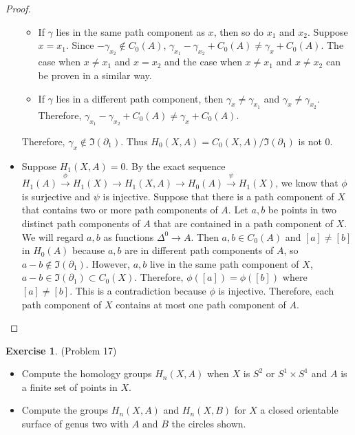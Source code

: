 \documentclass[12pt, psamsfonts]{amsart}
\theoremstyle{definition}
\newtheorem*{exer}{Exercise}
\theoremstyle{remark}
\numberwithin{equation}{section}
\begin{document}
\begin{proof}
\begin{itemize}
      \begin{itemize}
        \item
          If $\gamma$ lies in the same path component as $x$, then so do $x_1$ and $x_2$.
          Suppose $x = x_1$.
          Since $-\gamma_{x_2} \notin C_0(A)$, $\gamma_{x_1} - \gamma_{x_2} + C_0(A) \ne \gamma_x + C_0(A)$.
          The case when $x \ne x_1$ and $x = x_2$ and the case when $x \ne x_1$ and $x \ne x_2$ can be proven in a similar way.
        \item
          If $\gamma$ lies in a different path component, then $\gamma_x \ne \gamma_{x_1}$ and $\gamma_x \ne \gamma_{x_2}$.
          Therefore, $\gamma_{x_1} - \gamma_{x_2} + C_0(A) \ne \gamma_x + C_0(A)$.
      \end{itemize}
      Therefore, $\gamma_x \notin \Im(\partial_1)$.
      Thus $H_0(X, A) = C_0(X, A) / \Im(\partial_1)$ is not 0.
    \item
      Suppose $H_1(X, A) = 0$.
      By the exact sequence $H_1(A) \xrightarrow{\phi} H_1(X) \rightarrow H_1(X, A) \rightarrow H_0(A) \xrightarrow{\psi} H_1(X)$, we know that $\phi$ is surjective and $\psi$ is injective.
      Suppose that there is a path component of $X$ that contains two or more path components of $A$.
      Let $a, b$ be points in two distinct path components of $A$ that are contained in a path component of $X$.
      We will regard $a, b$ as functions $\Delta^0 \rightarrow A$.
      Then $a, b \in C_0(A)$ and $[a] \ne [b]$ in $H_0(A)$ because $a, b$ are in different path components of $A$, so $a - b \notin \Im(\partial_1)$.
      However, $a, b$ live in the same path component of $X$, $a - b \in \Im(\partial_1) \subset C_0(X)$.
      Therefore, $\phi([a]) = \phi([b])$ where $[a] \ne [b]$.
      This is a contradiction because $\phi$ is injective.
      Therefore, each path component of $X$ contains at most one path component of $A$.

  \end{itemize}
\end{proof}

\begin{exer}{(Problem 17)}
  $ $
  \begin{itemize}
    \item
      Compute the homology groups $H_n(X, A)$ when $X$ is $S^2$ or $S^1 \times S^1$ and $A$ is a finite set of points in $X$.
    \item
      Compute the groups $H_n(X, A)$ and $H_n(X, B)$ for $X$ a closed orientable surface of genus two with $A$ and $B$ the circles shown.
  \end{itemize}
\end{exer}
\end{document}
